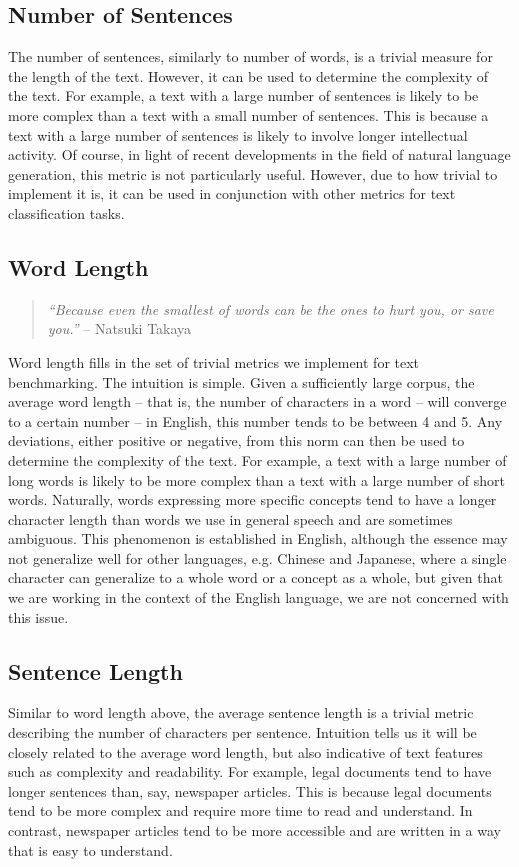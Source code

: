 \subsection{Number of Sentences}
The number of sentences, similarly to number of words, is a trivial measure for the length of the text. However, it can be used to determine the complexity of the text. For example, a text with a large number of sentences is likely to be more complex than a text with a small number of sentences. This is because a text with a large number of sentences is likely to involve longer intellectual activity. Of course, in light of recent developments in the field of natural language generation, this metric is not particularly useful. However, due to how trivial to implement it is, it can be used in conjunction with other metrics for text classification tasks.

\subsection{Word Length}
\begin{quote}
\textit{“Because even the smallest of words can be the ones to hurt you, or save you.”} -- Natsuki Takaya 
\end{quote}
Word length fills in the set of trivial metrics we implement for text benchmarking. The intuition is simple. Given a sufficiently large corpus, the average word length -- that is, the number of characters in a word -- will converge to a certain number -- in English, this number tends to be between 4 and 5. Any deviations, either positive or negative, from this norm can then be used to determine the complexity of the text. For example, a text with a large number of long words is likely to be more complex than a text with a large number of short words. Naturally, words expressing more specific concepts tend to have a longer character length than words we use in general speech and are sometimes ambiguous. This phenomenon is established in English, although the essence may not generalize well for other languages, e.g. Chinese and Japanese, where a single character can generalize to a whole word or a concept as a whole, but given that we are working in the context of the English language, we are not concerned with this issue.

\subsection{Sentence Length}
Similar to word length above, the average sentence length is a trivial metric describing the number of characters per sentence. Intuition tells us it will be closely related to the average word length, but also indicative of text features such as complexity and readability. For example, legal documents tend to have longer sentences than, say, newspaper articles. This is because legal documents tend to be more complex and require more time to read and understand. In contrast, newspaper articles tend to be more accessible and are written in a way that is easy to understand. 

